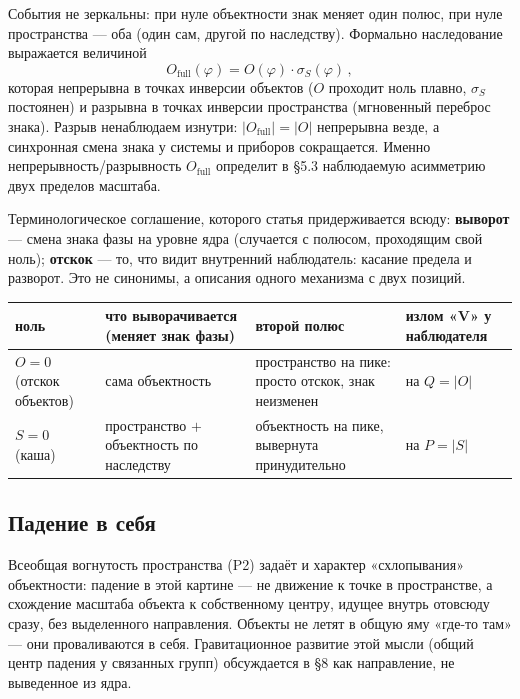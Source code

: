 \documentclass{article}
\begin{document}
События не зеркальны: при нуле объектности знак меняет один полюс, при нуле пространства --- оба (один сам, другой по наследству). Формально наследование выражается величиной
\begin{equation}
O_{\text{full}}(\varphi) = O(\varphi)\cdot\sigma_S(\varphi)\,,
\end{equation}
которая непрерывна в точках инверсии объектов ($O$ проходит ноль плавно, $\sigma_S$ постоянен) и разрывна в точках инверсии пространства (мгновенный переброс знака). Разрыв ненаблюдаем изнутри: $|O_{\text{full}}| = |O|$ непрерывна везде, а синхронная смена знака у системы и приборов сокращается. Именно непрерывность/разрывность $O_{\text{full}}$ определит в \S5.3 наблюдаемую асимметрию двух пределов масштаба.

Терминологическое соглашение, которого статья придерживается всюду: \textbf{выворот} --- смена знака фазы на уровне ядра (случается с полюсом, проходящим свой ноль); \textbf{отскок} --- то, что видит внутренний наблюдатель: касание предела и разворот. Это не синонимы, а описания одного механизма с двух позиций.

\begin{table}[htbp]
\centering
\small
\begin{tabular}{@{}p{2.6cm}p{3.6cm}p{3.6cm}p{2.2cm}@{}}
\toprule
\textbf{ноль} & \textbf{что выворачивается (меняет знак фазы)} & \textbf{второй полюс} & \textbf{излом «V» у наблюдателя} \\
\midrule
$O = 0$ (отскок объектов) & сама объектность & пространство на пике: просто отскок, знак неизменен & на $Q = |O|$ \\
\addlinespace
$S = 0$ (каша) & пространство $+$ объектность по наследству & объектность на пике, вывернута принудительно & на $P = |S|$ \\
\bottomrule
\end{tabular}
\end{table}

\subsection{Падение в себя}

Всеобщая вогнутость пространства (P2) задаёт и характер «схлопывания» объектности: падение в этой картине --- не движение к точке в пространстве, а схождение масштаба объекта к собственному центру, идущее внутрь отовсюду сразу, без выделенного направления. Объекты не летят в общую яму «где-то там» --- они проваливаются в себя. Гравитационное развитие этой мысли (общий центр падения у связанных групп) обсуждается в \S8 как направление, не выведенное из ядра.
\end{document}
